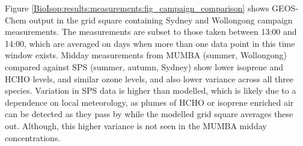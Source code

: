     
    
    Figure \ref{BioIsop:results:measurements:fig_campaign_comparison} shows GEOS-Chem output in the grid square containing Sydney and Wollongong campaign measurements.
    The measurements are subset to those taken between 13:00 and 14:00, which are averaged on days when more than one data point in this time window exists.
    Midday measurements from MUMBA (summer, Wollongong) compared against SPS (summer, autumn, Sydney) show lower isoprene and HCHO levels, and similar ozone levels, and also lower variance across all three species.
    Variation in SPS data is higher than modelled, which is likely due to a dependence on local meteorology, as plumes of HCHO or isoprene enriched air can be detected as they pass by while the modelled grid square averages these out.
    Although, this higher variance is not seen in the MUMBA midday concentrations.
    
    
    
